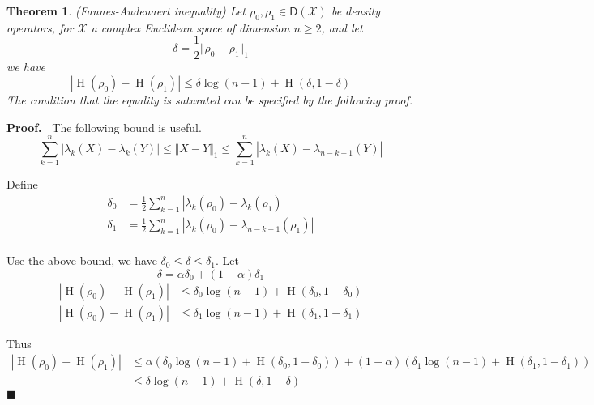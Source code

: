\documentclass[aps,pra,onecolumn,notitlepage,superscriptaddress]{revtex4-1}
\newcommand{\spc}[1]{\mathcal{#1}}
\newcommand{\D}{\mathsf{D}}
\newcommand{\op}[1]{\operatorname{#1}}
\newtheorem{theo}{Theorem}
\def\Proof{{\bf Proof.~}}
\def\qed{$\blacksquare$ \newline}
\begin{document}
    \begin{theo}
        (Fannes-Audenaert inequality) Let $\rho_0, \rho_1 \in \D(\spc X)$ be density operators, for $\spc X$ a complex Euclidean space of dimension $n \geq 2$, and let
        \begin{equation}
            \delta = \frac 1 2 \Vert \rho_0 - \rho_1 \Vert_1
        \end{equation}
        we have
        \begin{equation}
            |\op H(\rho_0) - \op H(\rho_1)| \leq \delta \log (n-1) + \op H(\delta, 1-\delta)
        \end{equation}
        The condition that the equality is saturated can be specified by the following proof.
    \end{theo}
    \Proof
    The following bound is useful.
    \begin{equation}
        \sum_{k = 1}^n |\lambda_k(X) - \lambda_k(Y)| \leq \Vert X - Y \Vert_1 \leq \sum_{k = 1}^n |\lambda_k(X) - \lambda_{n-k+1}(Y)| 
    \end{equation}

    Define
    \begin{align}
        \delta_0 &= \frac 1 2 \sum_{k=1}^n |\lambda_k(\rho_0) - \lambda_k(\rho_1)| \\
        \delta_1 &= \frac 1 2 \sum_{k=1}^n |\lambda_k(\rho_0) - \lambda_{n-k+1}(\rho_1)| \\
    \end{align}

    Use the above bound, we have $\delta_0 \leq \delta \leq \delta_1$. Let
    \begin{equation}
        \delta = \alpha \delta_0 + (1-\alpha) \delta_1
    \end{equation}
    \begin{align*}
        |\op H(\rho_0) - \op H(\rho_1)| &\leq \delta_0 \log (n-1) + \op H(\delta_0, 1-\delta_0) \\
        |\op H(\rho_0) - \op H(\rho_1)| &\leq \delta_1 \log (n-1) + \op H(\delta_1, 1-\delta_1)
    \end{align*}

    Thus
    \begin{align*}
        |\op H(\rho_0) - \op H(\rho_1)| &\leq \alpha (\delta_0 \log (n-1) + \op H(\delta_0, 1-\delta_0)) + (1-\alpha)(\delta_1 \log (n-1) + \op H(\delta_1, 1-\delta_1)) \\
        &\leq \delta \log (n-1) + \op H(\delta, 1-\delta)
    \end{align*}
    \qed
\end{document}

